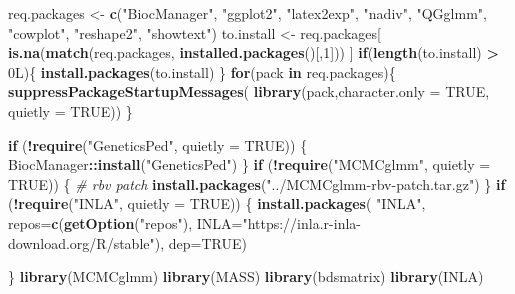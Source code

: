 \documentclass[
]{article}
\newenvironment{Shaded}{\begin{snugshade}}{\end{snugshade}}
\newcommand{\AttributeTok}[1]{\textcolor[rgb]{0.13,0.29,0.53}{#1}}
\newcommand{\CommentTok}[1]{\textcolor[rgb]{0.56,0.35,0.01}{\textit{#1}}}
\newcommand{\ConstantTok}[1]{\textcolor[rgb]{0.56,0.35,0.01}{#1}}
\newcommand{\ControlFlowTok}[1]{\textcolor[rgb]{0.13,0.29,0.53}{\textbf{#1}}}
\newcommand{\DecValTok}[1]{\textcolor[rgb]{0.00,0.00,0.81}{#1}}
\newcommand{\FunctionTok}[1]{\textcolor[rgb]{0.13,0.29,0.53}{\textbf{#1}}}
\newcommand{\NormalTok}[1]{#1}
\newcommand{\OtherTok}[1]{\textcolor[rgb]{0.56,0.35,0.01}{#1}}
\newcommand{\SpecialCharTok}[1]{\textcolor[rgb]{0.81,0.36,0.00}{\textbf{#1}}}
\newcommand{\StringTok}[1]{\textcolor[rgb]{0.31,0.60,0.02}{#1}}
\begin{document}
\begin{Shaded}
\begin{Highlighting}[]
\NormalTok{req.packages }\OtherTok{\textless{}{-}} \FunctionTok{c}\NormalTok{(}\StringTok{"BiocManager"}\NormalTok{, }\StringTok{"ggplot2"}\NormalTok{, }\StringTok{"latex2exp"}\NormalTok{, }\StringTok{"nadiv"}\NormalTok{,}
                  \StringTok{"QGglmm"}\NormalTok{, }\StringTok{"cowplot"}\NormalTok{, }\StringTok{"reshape2"}\NormalTok{, }\StringTok{"showtext"}\NormalTok{)}
\NormalTok{to.install }\OtherTok{\textless{}{-}}\NormalTok{ req.packages[}
  \FunctionTok{is.na}\NormalTok{(}\FunctionTok{match}\NormalTok{(req.packages, }\FunctionTok{installed.packages}\NormalTok{()[,}\DecValTok{1}\NormalTok{]))}
\NormalTok{  ]}
\ControlFlowTok{if}\NormalTok{(}\FunctionTok{length}\NormalTok{(to.install) }\SpecialCharTok{\textgreater{}}\NormalTok{ 0L)\{}
  \FunctionTok{install.packages}\NormalTok{(to.install)}
\NormalTok{\}}
\ControlFlowTok{for}\NormalTok{(pack }\ControlFlowTok{in}\NormalTok{ req.packages)\{}
  \FunctionTok{suppressPackageStartupMessages}\NormalTok{(}
    \FunctionTok{library}\NormalTok{(pack,}\AttributeTok{character.only =} \ConstantTok{TRUE}\NormalTok{, }\AttributeTok{quietly =} \ConstantTok{TRUE}\NormalTok{))}
\NormalTok{\}}

\ControlFlowTok{if}\NormalTok{ (}\SpecialCharTok{!}\FunctionTok{require}\NormalTok{(}\StringTok{"GeneticsPed"}\NormalTok{, }\AttributeTok{quietly =} \ConstantTok{TRUE}\NormalTok{)) \{}
\NormalTok{  BiocManager}\SpecialCharTok{::}\FunctionTok{install}\NormalTok{(}\StringTok{"GeneticsPed"}\NormalTok{)}
\NormalTok{\}}
\ControlFlowTok{if}\NormalTok{ (}\SpecialCharTok{!}\FunctionTok{require}\NormalTok{(}\StringTok{"MCMCglmm"}\NormalTok{, }\AttributeTok{quietly =} \ConstantTok{TRUE}\NormalTok{)) \{}
  \CommentTok{\# rbv patch}
  \FunctionTok{install.packages}\NormalTok{(}\StringTok{"../MCMCglmm{-}rbv{-}patch.tar.gz"}\NormalTok{)}
\NormalTok{\}}
\ControlFlowTok{if}\NormalTok{ (}\SpecialCharTok{!}\FunctionTok{require}\NormalTok{(}\StringTok{"INLA"}\NormalTok{, }\AttributeTok{quietly =} \ConstantTok{TRUE}\NormalTok{)) \{}
  \FunctionTok{install.packages}\NormalTok{(}
    \StringTok{"INLA"}\NormalTok{, }\AttributeTok{repos=}\FunctionTok{c}\NormalTok{(}\FunctionTok{getOption}\NormalTok{(}\StringTok{"repos"}\NormalTok{),}
                    \AttributeTok{INLA=}\StringTok{"https://inla.r{-}inla{-}download.org/R/stable"}\NormalTok{),}
    \AttributeTok{dep=}\ConstantTok{TRUE}\NormalTok{)}

\NormalTok{\}}
\FunctionTok{library}\NormalTok{(MCMCglmm)}
\FunctionTok{library}\NormalTok{(MASS)}
\FunctionTok{library}\NormalTok{(bdsmatrix)}
\FunctionTok{library}\NormalTok{(INLA)}


\end{Highlighting}
\end{Shaded}
\end{document}
